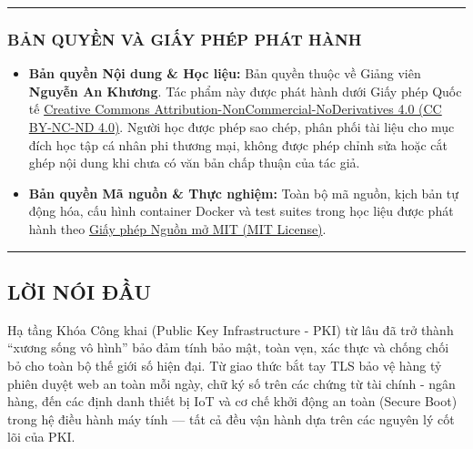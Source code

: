 \documentclass[
]{article}
\providecommand{\tightlist}{%
  \setlength{\itemsep}{0pt}\setlength{\parskip}{0pt}}
\begin{document}
\begin{center}\rule{0.5\linewidth}{0.5pt}\end{center}

\subsubsection{BẢN QUYỀN VÀ GIẤY PHÉP PHÁT
HÀNH}\label{bux1ea3n-quyux1ec1n-vuxe0-giux1ea5y-phuxe9p-phuxe1t-huxe0nh}

\begin{itemize}
\tightlist
\item
  \textbf{Bản quyền Nội dung \& Học liệu:} Bản quyền thuộc về Giảng viên
  \textbf{Nguyễn An Khương}. Tác phẩm này được phát hành dưới Giấy phép
  Quốc tế
  \href{https://creativecommons.org/licenses/by-nc-nd/4.0/}{Creative
  Commons Attribution-NonCommercial-NoDerivatives 4.0 (CC BY-NC-ND
  4.0)}. Người học được phép sao chép, phân phối tài liệu cho mục đích
  học tập cá nhân phi thương mại, không được phép chỉnh sửa hoặc cắt
  ghép nội dung khi chưa có văn bản chấp thuận của tác giả.
\item
  \textbf{Bản quyền Mã nguồn \& Thực nghiệm:} Toàn bộ mã nguồn, kịch bản
  tự động hóa, cấu hình container Docker và test suites trong học liệu
  được phát hành theo \href{https://opensource.org/licenses/MIT}{Giấy
  phép Nguồn mở MIT (MIT License)}.
\end{itemize}

\begin{center}\rule{0.5\linewidth}{0.5pt}\end{center}

\subsection{LỜI NÓI ĐẦU}\label{lux1eddi-nuxf3i-ux111ux1ea7u}

Hạ tầng Khóa Công khai (Public Key Infrastructure - PKI) từ lâu đã trở
thành ``xương sống vô hình'' bảo đảm tính bảo mật, toàn vẹn, xác thực và
chống chối bỏ cho toàn bộ thế giới số hiện đại. Từ giao thức bắt tay TLS
bảo vệ hàng tỷ phiên duyệt web an toàn mỗi ngày, chữ ký số trên các
chứng từ tài chính - ngân hàng, đến các định danh thiết bị IoT và cơ chế
khởi động an toàn (Secure Boot) trong hệ điều hành máy tính --- tất cả
đều vận hành dựa trên các nguyên lý cốt lõi của PKI.
\end{document}
